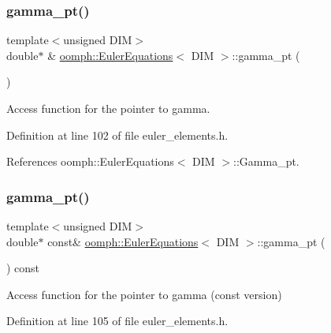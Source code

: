 \subsubsection{\texorpdfstring{gamma\+\_\+pt()}{gamma\_pt()}\hspace{0.1cm}{\footnotesize\ttfamily [1/2]}}
{\footnotesize\ttfamily template$<$unsigned D\+IM$>$ \\
double$\ast$ \& \hyperlink{classoomph_1_1EulerEquations}{oomph\+::\+Euler\+Equations}$<$ D\+IM $>$\+::gamma\+\_\+pt (\begin{DoxyParamCaption}{ }\end{DoxyParamCaption})\hspace{0.3cm}{\ttfamily [inline]}}



Access function for the pointer to gamma. 



Definition at line 102 of file euler\+\_\+elements.\+h.



References oomph\+::\+Euler\+Equations$<$ D\+I\+M $>$\+::\+Gamma\+\_\+pt.

\mbox{\label{classoomph_1_1EulerEquations_aec33261b153f07968bdc4277ca1aa5ad}} 
\subsubsection{\texorpdfstring{gamma\+\_\+pt()}{gamma\_pt()}\hspace{0.1cm}{\footnotesize\ttfamily [2/2]}}
{\footnotesize\ttfamily template$<$unsigned D\+IM$>$ \\
double$\ast$ const\& \hyperlink{classoomph_1_1EulerEquations}{oomph\+::\+Euler\+Equations}$<$ D\+IM $>$\+::gamma\+\_\+pt (\begin{DoxyParamCaption}{ }\end{DoxyParamCaption}) const\hspace{0.3cm}{\ttfamily [inline]}}



Access function for the pointer to gamma (const version) 



Definition at line 105 of file euler\+\_\+elements.\+h.



